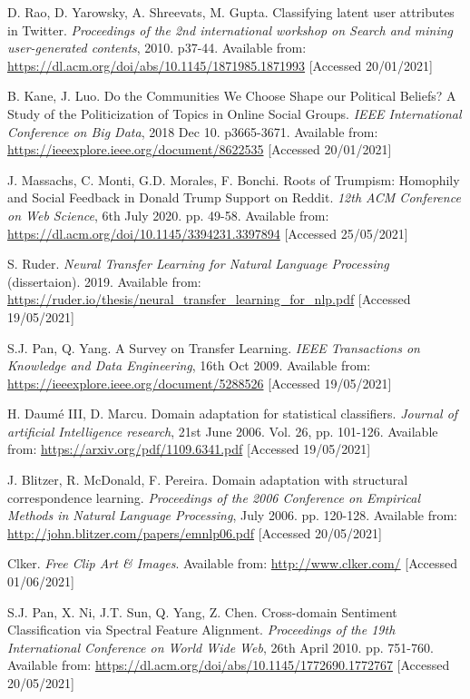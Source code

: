 \begin{thebibliography}{9}
D. Rao, D. Yarowsky, A. Shreevats, M. Gupta. Classifying latent user attributes in Twitter. \textit{Proceedings of the 2nd international workshop on Search and mining user-generated contents}, 2010. p37-44. Available from: \url{https://dl.acm.org/doi/abs/10.1145/1871985.1871993} [Accessed 20/01/2021]

B. Kane, J. Luo. Do the Communities We Choose Shape our Political Beliefs? A Study of the Politicization of Topics in Online Social Groups. \textit{IEEE International Conference on Big Data}, 2018 Dec 10. p3665-3671. Available from: \url{https://ieeexplore.ieee.org/document/8622535} [Accessed 20/01/2021]

J. Massachs, C. Monti, G.D. Morales, F. Bonchi. Roots of Trumpism: Homophily and Social Feedback in Donald Trump Support on Reddit. \textit{12th ACM Conference on Web Science}, 6th July 2020. pp. 49-58. Available from: \url{https://dl.acm.org/doi/10.1145/3394231.3397894} [Accessed 25/05/2021]

S. Ruder. \textit{Neural Transfer Learning for Natural Language Processing} (dissertaion). 2019. Available from: \url{https://ruder.io/thesis/neural_transfer_learning_for_nlp.pdf} [Accessed 19/05/2021]

S.J. Pan, Q. Yang. A Survey on Transfer Learning. \textit{IEEE Transactions on Knowledge and Data Engineering}, 16th Oct 2009. Available from: \url{https://ieeexplore.ieee.org/document/5288526} [Accessed 19/05/2021]

H. Daumé III, D. Marcu. Domain adaptation for statistical classifiers. \textit{Journal of artificial Intelligence research}, 21st June 2006. Vol. 26, pp. 101-126. Available from: \url{https://arxiv.org/pdf/1109.6341.pdf} [Accessed 19/05/2021]

J. Blitzer, R. McDonald, F. Pereira. Domain adaptation with structural correspondence learning. \textit{Proceedings of the 2006 Conference on Empirical Methods in Natural Language Processing}, July 2006. pp. 120-128. Available from: \url{http://john.blitzer.com/papers/emnlp06.pdf} [Accessed 20/05/2021]

Clker. \textit{Free Clip Art \& Images}. Available from: \url{http://www.clker.com/} [Accessed 01/06/2021]

S.J. Pan, X. Ni, J.T. Sun, Q. Yang, Z. Chen. Cross-domain Sentiment Classification via Spectral Feature Alignment. \textit{Proceedings of the 19th International Conference on World Wide Web}, 26th April 2010. pp. 751-760. Available from: \url{https://dl.acm.org/doi/abs/10.1145/1772690.1772767} [Accessed 20/05/2021]


\end{thebibliography}
